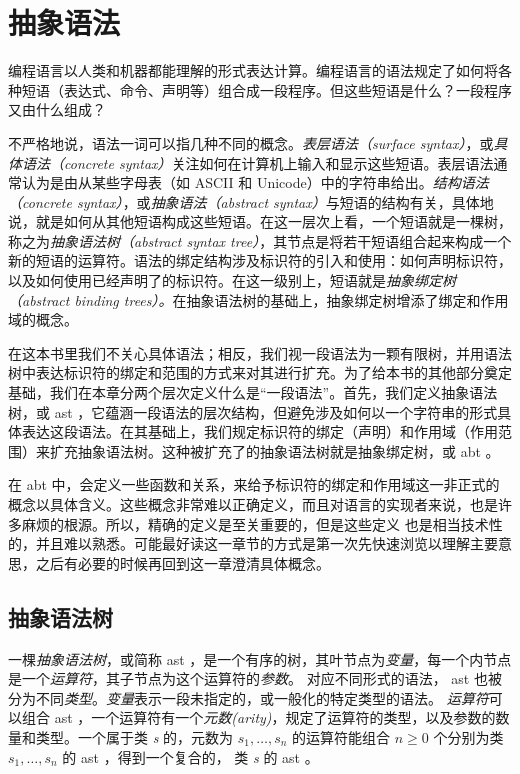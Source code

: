 \chapter{抽象语法}

编程语言以人类和机器都能理解的形式表达计算。编程语言的语法规定了如何将各种短语（表达式、命令、声明等）组合成一段程序。但这些短语是什么？一段程序又由什么组成？

不严格地说，语法一词可以指几种不同的概念。\emph{表层语法（surface
syntax）}，或\emph{具体语法（concrete
syntax）}关注如何在计算机上输入和显示这些短语。表层语法通常认为是由从某些字母表（如
ASCII 和 Unicode）中的字符串给出。\emph{结构语法（concrete
syntax）}，或\emph{抽象语法（abstract
syntax）}与短语的结构有关，具体地说，就是如何从其他短语构成这些短语。在这一层次上看，一个短语就是一棵树，称之为\emph{抽象语法树（abstract
syntax
tree）}，其节点是将若干短语组合起来构成一个新的短语的运算符。语法的绑定结构涉及标识符的引入和使用：如何声明标识符，以及如何使用已经声明了的标识符。在这一级别上，短语就是\emph{抽象绑定树（abstract
binding
trees）。}在抽象语法树的基础上，抽象绑定树增添了绑定和作用域的概念。

在这本书里我们不关心具体语法；相反，我们视一段语法为一颗有限树，并用语法树中表达标识符的绑定和范围的方式来对其进行扩充。为了给本书的其他部分奠定基础，我们在本章分两个层次定义什么是``一段语法''。首先，我们定义抽象语法树，或
ast
，它蕴涵一段语法的层次结构，但避免涉及如何以一个字符串的形式具体表达这段语法。在其基础上，我们规定标识符的绑定（声明）和作用域（作用范围）来扩充抽象语法树。这种被扩充了的抽象语法树就是抽象绑定树，或
abt 。

在 abt
中，会定义一些函数和关系，来给予标识符的绑定和作用域这一非正式的概念以具体含义。这些概念非常难以正确定义，而且对语言的实现者来说，也是许多麻烦的根源。所以，精确的定义是至关重要的，但是这些定义
也是相当技术性的，并且难以熟悉。可能最好读这一章节的方式是第一次先快速浏览以理解主要意思，之后有必要的时候再回到这一章澄清具体概念。

\section{抽象语法树}

一棵\emph{抽象语法树}，或简称 ast
，是一个有序的树，其叶节点为\emph{变量}，每一个内节点是一个\emph{运算符}，其子节点为这个运算符的\emph{参数}。
对应不同形式的语法， ast
也被分为不同\emph{类型}。\emph{变量}表示一段未指定的，或一般化的特定类型的语法。
\emph{运算符}可以组合 ast
，一个运算符有一个\emph{元数(arity)}，规定了运算符的类型，以及参数的数量和类型。一个属于类
\emph{s} 的，元数为 \(s_1,\dots,s_n\) 的运算符能组合 \( n \ge 0\)
个分别为类 \emph{\(s_1,\dots,s_n\)} 的 ast ，得到一个复合的， 类
\emph{s} 的 ast 。

